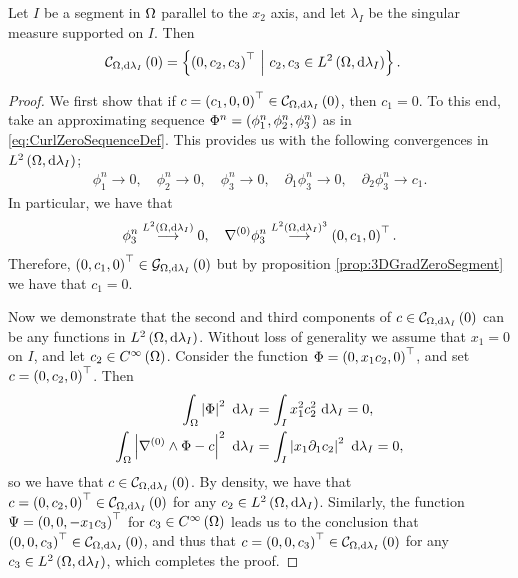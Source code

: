 \begin{prop} \label{prop:CurlZeroSegment}
	Let $I$ be a segment in $\Omega$ parallel to the $x_2$ axis, and let $\lambda_I$ be the singular measure supported on $I$.
	Then
	\begin{align*}
		\mathcal{C}_{ \Omega, \mathrm{d}\lambda_I}\left( 0 \right) &= 
		\left\{  \left( 0, c_2, c_3 \right)^\top \ \middle\vert \  c_2, c_3\in L^{2}\left( \Omega,\mathrm{d}\lambda_I \right)  \right\}.
	\end{align*}
\end{prop}
\begin{proof}
	We first show that if $c = \left( c_1, 0, 0 \right)^\top\in\mathcal{C}_{ \Omega, \mathrm{d}\lambda_I}\left( 0 \right)$, then $c_1=0$.
	To this end, take an approximating sequence $\Phi^n = \left( \phi^n_1, \phi_2^n, \phi_3^n \right)$ as in \eqref{eq:CurlZeroSequenceDef}.
	This provides us with the following convergences in $L^{2}\left( \Omega,\mathrm{d}\lambda_I \right)$;
	\begin{align*}
		\phi_1^n \rightarrow 0, \quad
		\phi_2^n \rightarrow 0, \quad
		\phi_3^n \rightarrow 0, \quad
		\partial_1\phi_3^n \rightarrow 0, \quad
		\partial_2\phi_3^n \rightarrow c_1.
	\end{align*}
	In particular, we have that
	\begin{align*}
		\phi_3^n \overset{L^{2}\left( \Omega,\mathrm{d}\lambda_I \right)}{\longrightarrow} 0, \quad
		\nabla^{(0)}\phi_3^n \overset{ L^{2}\left( \Omega,\mathrm{d}\lambda_I \right)^3 }{\longrightarrow} \left( 0, c_1, 0 \right)^\top.
	\end{align*}
	Therefore, $\left( 0, c_1, 0 \right)^\top\in\mathcal{G}_{ \Omega, \mathrm{d}\lambda_I}\left( 0 \right)$ but by proposition \ref{prop:3DGradZeroSegment} we have that $c_1=0$.
	
	Now we demonstrate that the second and third components of $c\in\mathcal{C}_{ \Omega, \mathrm{d}\lambda_I}\left( 0 \right)$ can be any functions in $L^{2}\left( \Omega,\mathrm{d}\lambda_I \right)$.
	Without loss of generality we assume that $x_1=0$ on $I$, and let $c_2\in C^{\infty}\left( \Omega \right)$.
	Consider the function $\Phi = \left( 0, x_1 c_2, 0  \right)^\top$, and set $c=\left( 0,c_2,0 \right)^\top$.
	Then
	\begin{align*}
		\int_{\Omega} \left\lvert \Phi \right\rvert^2  \ \mathrm{d}\lambda_I &= \int_{I} x_1^2 c_2^2  \ \mathrm{d}\lambda_I = 0, \\
		\int_{\Omega} \left\lvert \nabla^{(0)}\wedge\Phi - c \right\rvert^2  \ \mathrm{d}\lambda_I &= \int_{I} \left\lvert  x_1\partial_1 c_2 \right\rvert^2  \ \mathrm{d}\lambda_I = 0,
	\end{align*}
	so we have that $c\in\mathcal{C}_{ \Omega, \mathrm{d}\lambda_I}\left( 0 \right)$.
	By density, we have that $c=\left( 0,c_2,0 \right)^\top\in\mathcal{C}_{ \Omega, \mathrm{d}\lambda_I}\left( 0 \right)$ for any $c_2\in L^{2}\left( \Omega,\mathrm{d}\lambda_I \right)$.
	Similarly, the function $\Psi = \left( 0, 0, -x_1 c_3 \right)^\top$ for $c_3\in C^{\infty}\left( \Omega \right)$ leads us to the conclusion that $\left( 0,0,c_3 \right)^\top\in\mathcal{C}_{ \Omega, \mathrm{d}\lambda_I}\left( 0 \right)$, and thus that $c=\left( 0,0, c_3 \right)^\top\in\mathcal{C}_{ \Omega, \mathrm{d}\lambda_I}\left( 0 \right)$ for any $c_3\in L^{2}\left( \Omega,\mathrm{d}\lambda_I \right)$, which completes the proof.
\end{proof}

